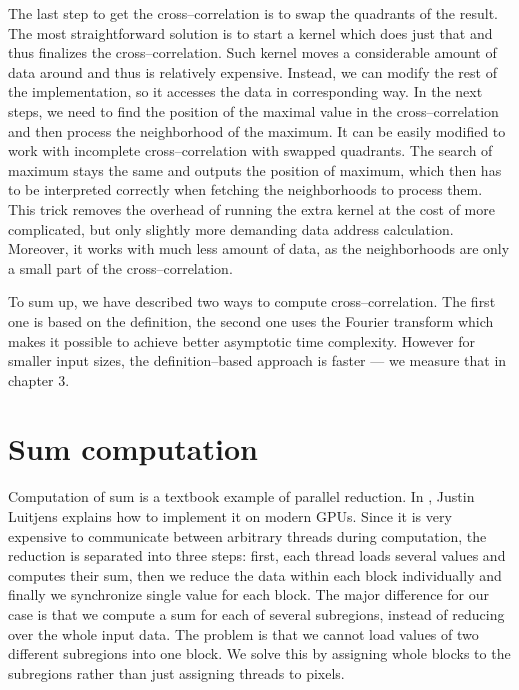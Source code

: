 The last step to get the cross--correlation is to swap the quadrants of the result. The most straightforward solution is to start a kernel which does just that and thus finalizes the cross--correlation. Such kernel moves a considerable amount of data around and thus is relatively expensive. Instead, we can modify the rest of the implementation, so it accesses the data in corresponding way. In the next steps, we need to find the position of the maximal value in the cross--correlation and then process the neighborhood of the maximum. It can be easily modified to work with incomplete cross--correlation with swapped quadrants. The search of maximum stays the same and outputs the position of maximum, which then has to be interpreted correctly when fetching the neighborhoods to process them. This trick removes the overhead of running the extra kernel at the cost of more complicated, but only slightly more demanding data address calculation. Moreover, it works with much less amount of data, as the neighborhoods are only a small part of the cross--correlation.

\vspace{5px}

To sum up, we have described two ways to compute cross--correlation. The first one is based on the definition, the second one uses the Fourier transform which makes it possible to achieve better asymptotic time complexity. However for smaller input sizes, the definition--based approach is faster --- we measure that in chapter 3.


\section{Sum computation}
\label{sums}

Computation of sum is a textbook example of parallel reduction. In \cite{parallelReduction}, Justin Luitjens explains how to implement it on modern GPUs. Since it is very expensive to communicate between arbitrary threads during computation, the reduction is separated into three steps: first, each thread loads several values and computes their sum, then we reduce the data within each block individually and finally we synchronize single value for each block. The major difference for our case is that we compute a sum for each of several subregions, instead of reducing over the whole input data. The problem is that we cannot load values of two different subregions into one block. We solve this by assigning whole blocks to the subregions rather than just assigning threads to pixels.

